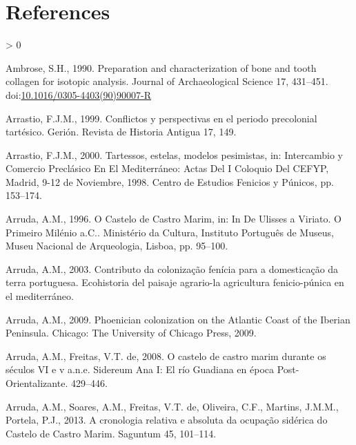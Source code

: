 \documentclass[5p]{elsarticle} %
\newlength{\cslhangindent}
\newenvironment{CSLReferences}[2] %
 {%
  \setlength{\parindent}{0pt}
  \ifodd #1 \everypar{\setlength{\hangindent}{\cslhangindent}}\ignorespaces\fi
  \ifnum #2 > 0
  \setlength{\parskip}{#2\baselineskip}
  \fi
 }%
 {}
\begin{document}
\hypertarget{references}{%
\section*{References}\label{references}}

\hypertarget{refs}{}
\begin{CSLReferences}{1}{0}
\leavevmode\hypertarget{ref-ambrose90}{}%
Ambrose, S.H., 1990. Preparation and characterization of bone and tooth collagen for isotopic analysis. Journal of Archaeological Science 17, 431--451. doi:\href{https://doi.org/10.1016/0305-4403(90)90007-R}{10.1016/0305-4403(90)90007-R}

\leavevmode\hypertarget{ref-arrastio99}{}%
Arrastio, F.J.M., 1999. Conflictos y perspectivas en el periodo precolonial tartésico. Gerión. Revista de Historia Antigua 17, 149.

\leavevmode\hypertarget{ref-arrastio00}{}%
Arrastio, F.J.M., 2000. Tartessos, estelas, modelos pesimistas, in: Intercambio y Comercio Preclásico En El {Mediterráneo}: Actas Del {I} Coloquio Del {CEFYP}, {Madrid}, 9-12 de Noviembre, 1998. {Centro de Estudios Fenicios y Púnicos}, pp. 153--174.

\leavevmode\hypertarget{ref-arruda96}{}%
Arruda, A.M., 1996. O {Castelo} de {Castro Marim}, in: In {De Ulisses} a {Viriato}. {O} Primeiro Milénio a.{C}.. {Ministério da Cultura, Instituto Português de Museus, Museu Nacional de Arqueologia}, {Lisboa}, pp. 95--100.

\leavevmode\hypertarget{ref-arruda03}{}%
Arruda, A.M., 2003. Contributo da colonização fenícia para a domesticação da terra portuguesa. Ecohistoria del paisaje agrario-la agricultura fenicio-púnica en el mediterráneo.

\leavevmode\hypertarget{ref-arruda09}{}%
Arruda, A.M., 2009. Phoenician colonization on the {Atlantic Coast} of the {Iberian Peninsula}. {Chicago: The University of Chicago Press, 2009.}

\leavevmode\hypertarget{ref-arruda_freitas08}{}%
Arruda, A.M., Freitas, V.T. de, 2008. O castelo de castro marim durante os séculos VI e v a.n.e. Sidereum Ana I: El río Guadiana en época Post-Orientalizante. 429--446.

\leavevmode\hypertarget{ref-arruda_etal13}{}%
Arruda, A.M., Soares, A.M., Freitas, V.T. de, Oliveira, C.F., Martins, J.M.M., Portela, P.J., 2013. A cronologia relativa e absoluta da ocupação sidérica do {Castelo} de {Castro Marim}. Saguntum 45, 101--114.


\end{CSLReferences}
\end{document}
